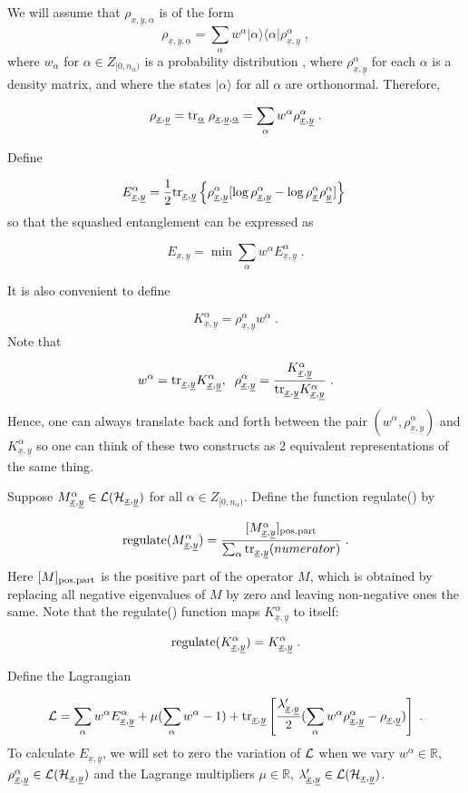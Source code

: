 \documentclass[12pt]{article}%
\newcommand{\bra}[1]{\langle#1|}
\newcommand{\ket}[1]{|#1\rangle}
\newcommand{\tr}[0]{{\rm tr }}
\newcommand{\beq}{\begin{equation}}
\newcommand{\eeq}{\end{equation}}
\newcommand{\ul}[1]{\underline{#1}}
\newcommand{\RR}[0]{{ \mathbb{R}} }
\newcommand{\rvx}[0]{{\ul{x}}}
\newcommand{\rvy}[0]{{\ul{y}}}
\newcommand{\calh}[0]{{\cal H}}
\newcommand{\call}[0]{{\cal L}}
\newcommand{\lam}[0]{\lambda}
\newcommand{\rvalp}[0]{{\ul{\alpha}}}
\newcommand{\alp}[0]{{\alpha}}
\begin{document}
We will assume that $\rho_{\rvx, \rvy, \rvalp}$
is of the form
\beq
\rho_{\rvx, \rvy, \rvalp} =
\sum_\alp w^\alp \ket{\alp}\bra{\alp} \rho_{\rvx, \rvy}^\alp
\;,
\eeq
where $w_\alp$ for $\alp\in Z_{[0, n_\alp)}$
is a probability distribution
, where $\rho^\alp_{\rvx, \rvy}$
for each $\alp$ is a density matrix,
and where the states $\ket{\alp}$
for all $\alp$ are orthonormal.
Therefore,

\beq
\rho_{\rvx, \rvy} =
\tr_\rvalp\; \rho_{\rvx, \rvy, \rvalp} =
\sum_\alp
w^\alp \rho_{\rvx, \rvy}^\alp
\;.
\eeq

Define


\beq
E^\alp_{\rvx, \rvy}=\frac{1}{2}\tr_{\rvx, \rvy}\left\{
\rho^{\alp}_{\rvx,\rvy}[
\log \rho^{\alp}_{\rvx,\rvy}
-
\log \rho^{\alp}_{\rvx}
\rho^{\alp}_{\rvy}]
\right\}
\;
\eeq
so that the squashed entanglement can be expressed as


\beq
E_{\rvx, \rvy}=\min
\sum_\alp w^\alp
E^\alp_{\rvx, \rvy}
\;.
\eeq

It is also convenient to define

\beq
K^\alp_{\rvx, \rvy}=\rho^\alp_{\rvx, \rvy}w^\alp
\;.
\eeq
Note that 

\beq
w^\alp=\tr_{\rvx, \rvy}K^\alp_{\rvx, \rvy}, \;\;
\rho^\alp_{\rvx, \rvy}=\frac{K^\alp_{\rvx, \rvy}}{\tr_{\rvx, \rvy}K^\alp_{\rvx, \rvy}}
\;.
\eeq
Hence, one can always translate back and forth
between the pair $(w^\alp, \rho^\alp_{\rvx, \rvy})$ and
$K^\alp_{\rvx, \rvy}$ so one can think of these two constructs
as 2 equivalent representations of the same thing.

Suppose $M^\alp_{\rvx, \rvy}\in \call(\calh_{\rvx, \rvy})$ for all $\alp\in Z_{[0, n_\rvalp)}$.
Define the function regulate() by


\beq
{\rm regulate}(M^\alp_{\rvx, \rvy}) =
 \frac{[M^\alp_{\rvx, \rvy}]_{\rm pos. part}}{\sum_{\alp}\tr_{\rvx, \rvy} (numerator)}
 \;.
\eeq
Here $[M]_{\rm pos.part}$ is the positive part of the operator $M$,
which is obtained by replacing all negative eigenvalues of $M$ by zero
and leaving non-negative ones the same.
Note that the regulate() function maps $K^\alp_{\rvx, \rvy}$ to itself:

\beq
{\rm regulate}(K^\alp_{\rvx, \rvy})=K^\alp_{\rvx, \rvy}
\;.
\eeq

Define the Lagrangian

\beq
{\cal L}=
\sum_\alp w^\alp
E^\alp_{\rvx, \rvy}
+ \mu(\sum_\alp w^\alp -1)
+\tr_{\rvx, \rvy}\left[
\frac{\lam'_{\rvx, \rvy}}{2}(\sum_\alp w^\alp
\rho^\alp_{\rvx, \rvy}-\rho_{\rvx,\rvy})
\right]
\;.
\eeq
To calculate $E_{\rvx, \rvy}$, we will set to zero
the variation of $\call$ when we vary $w^\alp\in \RR$, $\rho^\alp_{\rvx,\rvy}
\in \call(\calh_{\rvx, \rvy})$
and the Lagrange multipliers $\mu\in \RR$, $\lam'_{\rvx, \rvy}\in\call(\calh_{\rvx, \rvy})$.
\end{document}
